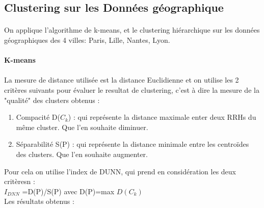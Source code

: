 \documentclass{report}
\begin{document}
\subsection{Clustering sur les Données géographique}
\paragraph{}
On applique l’algorithme de k-means, et le clustering hiérarchique sur les données géographiques des 4 villes: Paris, Lille, Nantes,
Lyon.\\\\
\textbf{K-means}
\paragraph{}
La mesure de distance utilisée est la distance Euclidienne et on utilise les 2 critères suivants pour évaluer le resultat de clustering,
c'est à dire la mesure de la "qualité" des clusters obtenus :
\begin{enumerate}
  \item Compacité D($C_{k}$) : qui représente la distance maximale enter deux RRHs du même cluster. Que l’en souhaite diminuer. 
  \item Séparabilité S(P) : qui représente la distance minimale entre les centroïdes des clusters. Que l’en souhaite augmenter.
\end{enumerate}
Pour cela on utilise l’index de DUNN, qui prend en considération les deux critèresn :\\
$I_{DNN}$ =D(P)/S(P) avec D(P)=max $D(C_{k})$ \\
Les résultats obtenus : 
\end{document}
